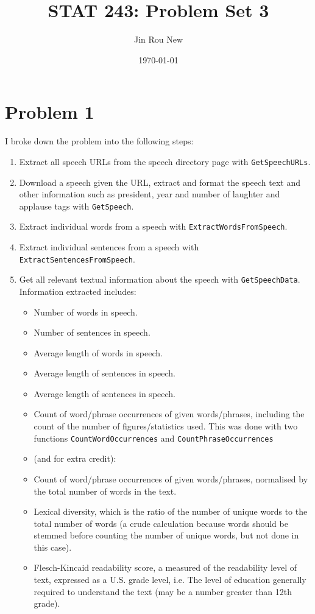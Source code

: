 \documentclass{article}\usepackage[]{graphicx}\usepackage[]{color}
\title{STAT 243: Problem Set 3}
\author{Jin Rou New}
\date{\today}
\begin{document}
\maketitle

\section{Problem 1}

I broke down the problem into the following steps:
\begin{enumerate}

\item Extract all speech URLs from the speech directory page with \texttt{GetSpeechURLs}.
\item Download a speech given the URL, extract and format the speech text and other information such as president, year and number of laughter and applause tags with \texttt{GetSpeech}.
\item Extract individual words from a speech with \texttt{ExtractWordsFromSpeech}.
\item Extract individual sentences from a speech with \texttt{ExtractSentencesFromSpeech}.
\item Get all relevant textual information about the speech with \texttt{GetSpeechData}. Information extracted includes:
  \begin{itemize}
  \item Number of words in speech.
  \item Number of sentences in speech.
  \item Average length of words in speech.
  \item Average length of sentences in speech.
  \item Average length of sentences in speech.
  \item Count of word/phrase occurrences of given words/phrases, including the count of the number of figures/statistics used. This was done with two functions \texttt{CountWordOccurrences} and \texttt{CountPhraseOccurrences}
  \item (and for extra credit):
  \item Count of word/phrase occurrences of given words/phrases, normalised by the total number of words in the text.
  \item Lexical diversity, which is the ratio of the number of unique words to the total number of words (a crude calculation because words should be stemmed before counting the number of unique words, but not done in this case).
  \item Flesch-Kincaid readability score, a measured of the readability level of text, expressed as a U.S. grade level, i.e. The level of education generally required to understand the text (may be a number greater than 12th grade).

\end{itemize}
\end{enumerate}
\end{document}
